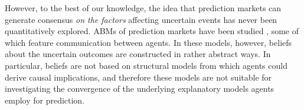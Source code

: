 \documentclass{article}\usepackage[]{graphicx}\usepackage[]{color}
\begin{document}
% 	

However, to the best of our knowledge, the idea that prediction markets can generate consensus \emph{on the factors} affecting  uncertain events has never been quantitatively explored. ABMs of prediction markets have been studied \cite{Klingert2012c,Tseng2010a,Jumadinova2011a}, some of which feature communication between agents. In these models, however, beliefs about the uncertain outcomes are constructed in rather abstract ways. In particular, beliefs are not based on structural models from which agents could derive causal implications, and therefore these models are not suitable for investigating the convergence of the underlying explanatory models agents employ for prediction.
\end{document}
